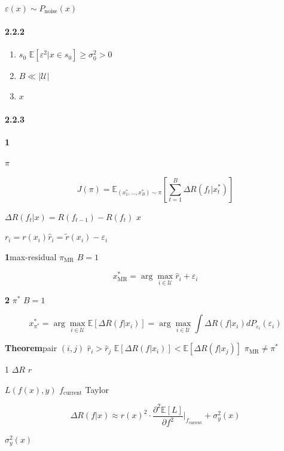 \documentclass[
  12pt,
]{article}
\providecommand{\tightlist}{%
  \setlength{\itemsep}{0pt}\setlength{\parskip}{0pt}}
\begin{document}
 \(\varepsilon(x) \sim P_{\text{noise}}(x)\) 

\paragraph{2.2.2 }\label{ux5047ux8bbe}

\begin{enumerate}
\def\labelenumi{\arabic{enumi}.}
\tightlist
\item
  \textbf{} \(s_0\)
  \(\mathbb{E}[\varepsilon^2 | x \in s_0] \geq \sigma_0^2 > 0\)
\item
  \textbf{} \(B \ll |\mathcal{U}|\)
\item
  \textbf{} \(x\)
\end{enumerate}

\paragraph{2.2.3 }\label{ux8bc1ux660e-1}

\textbf{ 1}

 \(\pi\) 

\[J(\pi) = \mathbb{E}_{(x_1^*, \ldots, x_B^*) \sim \pi}[\sum_{t=1}^B \Delta R(f_t | x_t^*)]\]

 \(\Delta R(f_t | x) = R(f_{t-1}) - R(f_t)\)  \(x\)


 \(r_i = r(x_i)\)\(\hat{r}_i = \tilde{r}(x_i) - \varepsilon_i\)


\textbf{ 1}max-residual  \(\pi_{\text{MR}}\)  \(B=1\)


\[x_{\text{MR}}^* = \arg\max_{i \in \mathcal{U}} \hat{r}_i + \varepsilon_i\]

\textbf{ 2} \(\pi^*\)  \(B=1\) 

\[x_{\pi^*}^* = \arg\max_{i \in \mathcal{U}} \mathbb{E}[\Delta R(f | x_i)] = \arg\max_{i \in \mathcal{U}} \int \Delta R(f | x_i) dP_{\varepsilon_i}(\varepsilon_i)\]

\textbf{Theorem}pair \((i,j)\) 
\(\hat{r}_i > \hat{r}_j\) 
\(\mathbb{E}[\Delta R(f|x_i)] < \mathbb{E}[\Delta R(f|x_j)]\)
\(\pi_{\text{MR}} \neq \pi^*\)

\textbf{}

 1 \(\Delta R\)  \(r\) 

 \(L(f(x), y)\)  \(f_{\text{current}}\)  Taylor 

\[\Delta R(f|x) \approx r(x)^2 \cdot \frac{\partial^2 \mathbb{E}[L]}{\partial f^2}\bigg|_{f_{\text{current}}} + \sigma_y^2(x)\]

 \(\sigma_y^2(x)\) 
\end{document}
